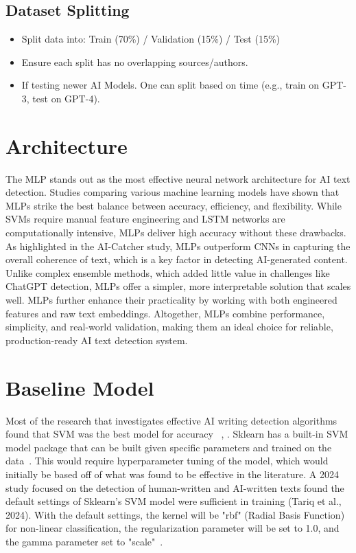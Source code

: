 \documentclass{article} %
\begin{document}
\subsection{Dataset Splitting}
\begin{itemize}
    \item Split data into: Train (70\%) / Validation (15\%) / Test (15\%)
    \item Ensure each split has no overlapping sources/authors.
    \item If testing newer AI Models. One can split based on time (e.g., train on GPT-3, test on GPT-4).
\end{itemize}

\section{Architecture}
The MLP stands out as the most effective neural network architecture for AI text detection. Studies comparing various machine learning models have shown that MLPs strike the best balance between accuracy, efficiency, and flexibility\citep{DeepLearning2024}. While SVMs require manual feature engineering and LSTM networks are computationally intensive, MLPs deliver high accuracy without these drawbacks. As highlighted in the AI-Catcher study, MLPs outperform CNNs in capturing the overall coherence of text, which is a key factor in detecting AI-generated content. Unlike complex ensemble methods, which added little value in challenges like ChatGPT detection, MLPs offer a simpler, more interpretable solution that scales well. MLPs further enhance their practicality by working with both engineered features and raw text embeddings. Altogether, MLPs combine performance, simplicity, and real-world validation, making them an ideal choice for reliable, production-ready AI text detection system.

\section{Baseline Model}
Most of the research that investigates effective AI writing detection algorithms found that SVM was the best model for accuracy ~\citep{AIessays2023}, \citep{Approaches}.
Sklearn has a built-in SVM model package that can be built given specific parameters and trained on the data~\citep{GeeksForGeeks}. This would require hyperparameter tuning of the model, which would initially be based off of what was found to be effective in the literature. A 2024 study focused on the detection of human-written and AI-written texts found the default settings of Sklearn's SVM model were sufficient in training (Tariq et al., 2024). With the default settings, the kernel will be "rbf" (Radial Basis Function) for non-linear classification, the regularization parameter will be set to 1.0, and the gamma parameter set to "scale"~\citep{Approaches}.
\end{document}
